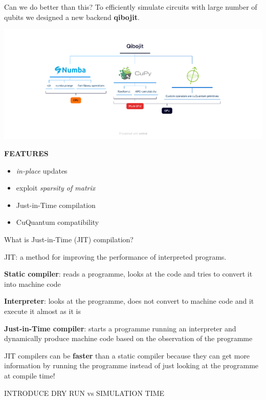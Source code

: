 \documentclass[11p,aspectratio=169]{beamer}
\begin{document}
\begin{frame}{Can we do better than this?}
    To efficiently simulate circuits with large number of qubits we designed
    a new backend \textbf{qibojit}.


    \includegraphics[width=\textwidth]{figures/Qibojit.pdf}
    
    \textbf{FEATURES}
    \begin{multicols*}{2}
        \begin{itemize}
            \item \emph{in-place} updates 
            \item exploit \emph{sparsity of matrix}
            \item Just-in-Time compilation
            \item CuQuantum compatibility
        \end{itemize}
    \end{multicols*}

\end{frame}

\begin{frame}{What is Just-in-Time (JIT) compilation?}

    JIT: a method for improving the performance of interpreted programs.

    \textbf{Static compiler}: reads a programme, looks at the code and tries 
    to convert it into machine code

    \textbf{Interpreter}: looks at the programme, does not convert to machine
    code and it execute it almost as it is

    \textbf{Just-in-Time compiler}: starts a programme running an interpreter
    and dynamically produce machine code based on the observation of the programme

    JIT compilers can be \textbf{faster} than a static compiler because they can get
    more information by running the programme instead of just looking at the
    programme at compile time! 

    INTRODUCE DRY RUN vs SIMULATION TIME

    
\end{frame}
\end{document}

